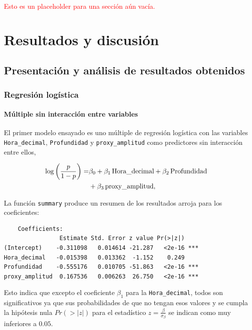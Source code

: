 \documentclass[a4paper]{report}
\begin{document}
\textcolor{red}{Esto es un placeholder para una sección aún vacía.}



\chapter{Resultados y discusión}

\section{Presentación y análisis de resultados obtenidos}

\subsection{Regresión logística}

\subsubsection*{Múltiple sin interacción entre variables}

El primer modelo ensayado es uno múltiple de regresión logística con las variables \verb'Hora_decimal', \verb'Profundidad' y \verb'proxy_amplitud' como predictores sin interacción entre ellos,

\begin{align}
	\log \left( \frac{p}{1-p} \right) = &
	 \beta_0 + \beta_1\, \text{Hora\_decimal} + \beta_2 \, \text{Profundidad}\notag\\
	& + \beta_3 \, \text{proxy\_amplitud},
	\label{eq:regresion_logistica}
\end{align}

La función \verb'summary' produce un resumen de los resultados arroja para los coeficientes:
\begin{verbatim}
	Coefficients:
                Estimate Std. Error z value Pr(>|z|)    
(Intercept)    -0.311098   0.014614 -21.287   <2e-16 ***
Hora_decimal   -0.015398   0.013362  -1.152    0.249    
Profundidad    -0.555176   0.010705 -51.863   <2e-16 ***
proxy_amplitud  0.167536   0.006263  26.750   <2e-16 ***
\end{verbatim} 
Esto indica que excepto el coeficiente \(\beta_1\) para la \verb'Hora_decimal', todos son significativos ya que sus probabilidades de que no tengan esos valores y se cumpla la hipótesis nula \(Pr(>|z|)\) para el estadístico \(z = \frac{\beta}{\sigma_\beta}\) se indican como muy inferiores a \(0.05\).
\end{document}
